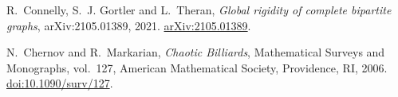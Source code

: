 R.~Connelly, S.~J. Gortler and L.~Theran,
\emph{Global rigidity of complete bipartite graphs},
arXiv:2105.01389, 2021.
\href{https://arxiv.org/abs/2105.01389}{arXiv:2105.01389}.

N.~Chernov and R.~Markarian, \emph{Chaotic Billiards},
Mathematical Surveys and Monographs, vol.~127,
American Mathematical Society, Providence, RI, 2006.
\href{https://doi.org/10.1090/surv/127}{doi:10.1090/surv/127}.
